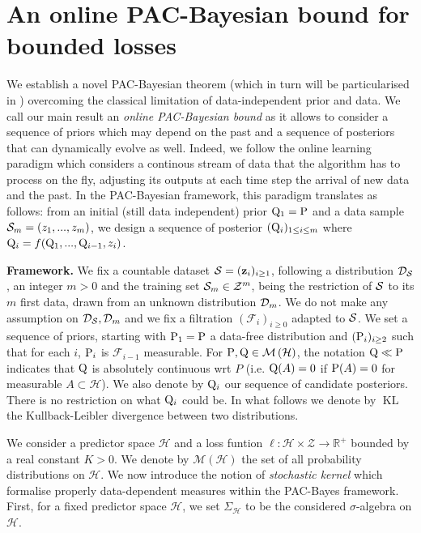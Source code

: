 \section{An online PAC-Bayesian bound for bounded losses}
\label{sec: main_bound}
We establish a novel PAC-Bayesian theorem (which in turn will be particularised in ) overcoming the classical limitation of data-independent prior and \iid data.
We call our main result an \emph{online PAC-Bayesian bound} as it allows to consider a sequence of priors which may depend on the past and a sequence of posteriors that can dynamically evolve as well. Indeed, we follow the online learning paradigm which considers a continous stream of data that the algorithm has to process on the fly, adjusting its outputs at each time step \wrt the arrival of new data and the past. In the PAC-Bayesian framework, this paradigm translates as follows: from an initial (still data independent) prior $\Q_1=\P$ and a data sample $\Sm= (z_1,...,z_m)$, we design a sequence of posterior $(\Q_{i})_{1\leq i\leq m }$ where $\Q_{i}= f(\Q_1,...,\Q_{i-1},z_i)$.

\textbf{Framework.}  We fix a countable dataset $\S=(\z_i)_{i\geq 1}$, following a distribution $\D_{\S}$, an integer $m>0$ and the training set $\Sm\in\mathcal{Z}^m$, being the restriction of $\S$ to its $m$ first data, drawn from an unknown distribution $\Dm$. We do not make any assumption on $\D_{\S},\Dm$ and we fix a filtration $(\mathcal{F}_i)_{i\geq 0}$ adapted to $\S$. We set a sequence of priors, starting with $\P_1=\P$ a data-free distribution and $(\P_{i})_{i\geq 2}$ such that for each $i$, $\P_{i}$ is $\mathcal{F}_{i-1}$ measurable.
For $\P,\Q \in \mathcal{M}\left(\mathcal{H}\right)$, the notation $\Q \ll \P$ indicates that $\Q$ is absolutely continuous wrt $P$ (i.e. $\Q(A) = 0$ if $\P(A) = 0$ for measurable $A \subset \mathcal{H}$).
We also denote by $\Q_{i}$ our sequence of candidate posteriors. There is no restriction on what $\Q_{i}$ could be.
In what follows we denote by $\operatorname{KL}$ the Kullback-Leibler divergence between two distributions.

We consider a predictor space $\mathcal{H}$ and a loss funtion $\ell: \mathcal{H}\times \mathcal{Z} \rightarrow \mathbb{R}^+$ bounded by a real constant $K>0$. We denote by $\mathcal{M}(\mathcal{H})$ the set of all probability distributions on $\mathcal{H}$.
 We now introduce the notion of \emph{stochastic kernel} \citep{rivasplata2020pac} which formalise properly data-dependent measures within the PAC-Bayes framework. First, for a fixed predictor space $\mathcal{H}$, we set $\Sigma_{\mathcal{H}}$ to be the considered $\sigma$-algebra on $\mathcal{H}$.

